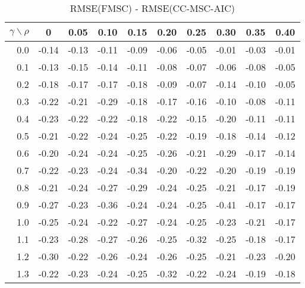\documentclass[12pt]{article}
\begin{document}
\begin{table}[!tbp]
\caption{RMSE(FMSC) - RMSE(CC-MSC-AIC)}
 \begin{center}
 \begin{tabular}{r|rrrrrrrrr}\hline\hline
\multicolumn{1}{c|}{$\gamma\backslash\rho$}&\multicolumn{1}{c}{0}&\multicolumn{1}{c}{0.05}&\multicolumn{1}{c}{0.10}&\multicolumn{1}{c}{0.15}&\multicolumn{1}{c}{0.20}&\multicolumn{1}{c}{0.25}&\multicolumn{1}{c}{0.30}&\multicolumn{1}{c}{0.35}&\multicolumn{1}{c}{0.40}\tabularnewline
\hline

0.0&-0.14&-0.13&-0.11&-0.09&-0.06&-0.05&-0.01&-0.03&-0.01\tabularnewline
0.1&-0.13&-0.15&-0.14&-0.11&-0.08&-0.07&-0.06&-0.08&-0.05\tabularnewline
0.2&-0.18&-0.17&-0.17&-0.18&-0.09&-0.07&-0.14&-0.10&-0.05\tabularnewline
0.3&-0.22&-0.21&-0.29&-0.18&-0.17&-0.16&-0.10&-0.08&-0.11\tabularnewline
0.4&-0.23&-0.22&-0.22&-0.18&-0.22&-0.15&-0.20&-0.11&-0.11\tabularnewline
0.5&-0.21&-0.22&-0.24&-0.25&-0.22&-0.19&-0.18&-0.14&-0.12\tabularnewline
0.6&-0.20&-0.24&-0.24&-0.25&-0.26&-0.21&-0.29&-0.17&-0.14\tabularnewline
0.7&-0.22&-0.23&-0.24&-0.34&-0.20&-0.22&-0.20&-0.19&-0.19\tabularnewline
0.8&-0.21&-0.24&-0.27&-0.29&-0.24&-0.25&-0.21&-0.17&-0.19\tabularnewline
0.9&-0.27&-0.23&-0.36&-0.24&-0.24&-0.25&-0.41&-0.17&-0.17\tabularnewline
1.0&-0.25&-0.24&-0.22&-0.27&-0.24&-0.25&-0.23&-0.21&-0.17\tabularnewline
1.1&-0.23&-0.28&-0.27&-0.26&-0.25&-0.32&-0.25&-0.18&-0.17\tabularnewline
1.2&-0.30&-0.22&-0.26&-0.24&-0.26&-0.25&-0.21&-0.23&-0.20\tabularnewline
1.3&-0.22&-0.23&-0.24&-0.25&-0.32&-0.22&-0.24&-0.19&-0.18\tabularnewline
\hline
\end{tabular}

\end{center}

\end{table}

%
\end{document}

